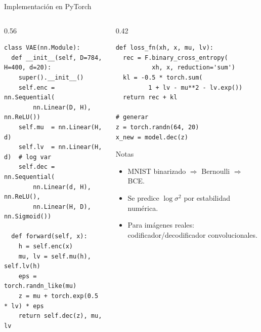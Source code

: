 \documentclass[aspectratio=169, 10pt]{beamer}
\begin{document}
\begin{frame}{Implementaci\'on en PyTorch}

	\begin{columns}[T]
		\begin{column}{0.56\textwidth}
			\begin{tcolorbox}[colback=LightGray, colframe=UCMNavy, arc=3pt, boxsep=1pt, left=4pt, right=4pt, top=2pt, bottom=2pt]
\scriptsize
\begin{verbatim}
class VAE(nn.Module):
  def __init__(self, D=784, H=400, d=20):
    super().__init__()
    self.enc = nn.Sequential(
        nn.Linear(D, H), nn.ReLU())
    self.mu  = nn.Linear(H, d)
    self.lv  = nn.Linear(H, d)  # log var
    self.dec = nn.Sequential(
        nn.Linear(d, H), nn.ReLU(),
        nn.Linear(H, D), nn.Sigmoid())

  def forward(self, x):
    h = self.enc(x)
    mu, lv = self.mu(h), self.lv(h)
    eps = torch.randn_like(mu)
    z = mu + torch.exp(0.5 * lv) * eps
    return self.dec(z), mu, lv
\end{verbatim}
			\end{tcolorbox}
		\end{column}

		\begin{column}{0.42\textwidth}
			\begin{tcolorbox}[colback=LightGray, colframe=UCMNavy, arc=3pt, boxsep=1pt, left=4pt, right=4pt, top=2pt, bottom=2pt]
\scriptsize
\begin{verbatim}
def loss_fn(xh, x, mu, lv):
  rec = F.binary_cross_entropy(
          xh, x, reduction='sum')
  kl = -0.5 * torch.sum(
         1 + lv - mu**2 - lv.exp())
  return rec + kl

# generar
z = torch.randn(64, 20)
x_new = model.dec(z)
\end{verbatim}
			\end{tcolorbox}

			\vspace{0.2cm}

			\begin{block}{Notas}
				\scriptsize
				\begin{itemize}
					\item MNIST binarizado $\Rightarrow$ Bernoulli $\Rightarrow$ BCE.
					\item Se predice $\log\sigma^2$ por estabilidad num\'erica.
					\item Para im\'agenes reales: codificador/decodificador convolucionales.
				\end{itemize}
			\end{block}
		\end{column}
	\end{columns}

\end{frame}
\end{document}
